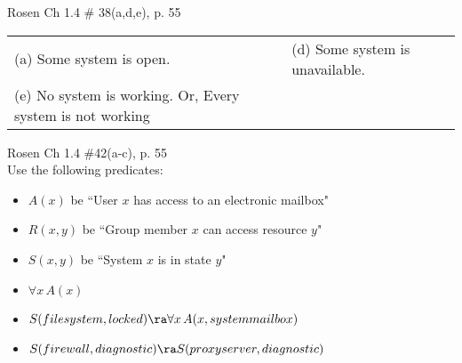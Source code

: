 \begin{questions}
 Rosen Ch 1.4 \# 38(a,d,e), p. 55
    \ifprintanswers
        \vspace{-12pt}
    \fi
  \begin{solution}
      \begin{tabular}{ll} 
        (a) Some system is open. & (d) Some system is unavailable. \\
        (e) No system is working.  Or, Every system is not working
      \end{tabular}
  \end{solution}


 Rosen Ch 1.4 \#42(a-c), p. 55\\
Use the following predicates:
  \begin{itemize}[itemsep=0pt,parsep=0pt,topsep=0pt,partopsep=0pt]
    \item $A(x)$ be ``User $x$ has access to an electronic mailbox"
    \item $R(x,y)$ be ``Group member $x$ can access resource $y$"
    \item $S(x,y)$ be ``System $x$ is in state $y$"
  \end{itemize}
    \ifprintanswers
        \vspace{-12pt}
    \fi
  \begin{solution}
    \begin{itemize}[itemsep=0pt,parsep=0pt,topsep=0pt,partopsep=0pt]
      \item $\forall x\, A(x)$
      \item $S(file system, locked) \ra  \forall x\, A(x, system mailbox)$
      \item $S(firewall, diagnostic) \ra S(proxy server, diagnostic)$
    \end{itemize}
  \end{solution}




\end{questions}
